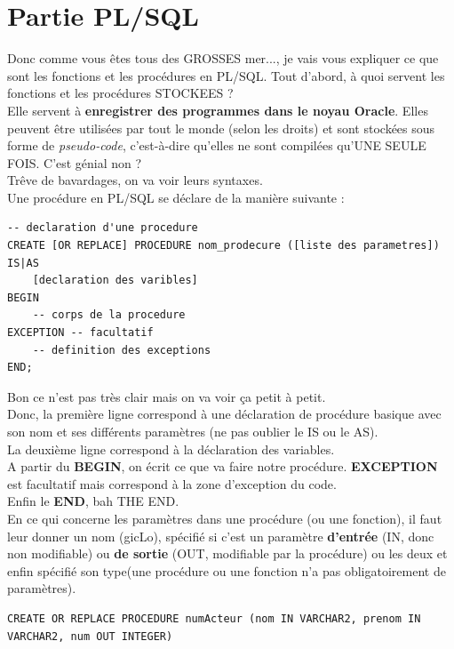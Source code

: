 \documentclass{report}
\begin{document}
\section{Partie PL/SQL}
Donc comme vous êtes tous des GROSSES mer..., je vais vous expliquer ce que sont les fonctions et les procédures en PL/SQL.
Tout d'abord, à quoi servent les fonctions et les procédures STOCKEES ?\\
Elle servent à \textbf{enregistrer des programmes dans le noyau Oracle}. Elles peuvent être utilisées par tout le monde (selon les droits) et sont stockées sous forme de \textit{pseudo-code}, c'est-à-dire qu'elles ne sont compilées qu'UNE SEULE FOIS. C'est génial non ?\\
Trêve de bavardages, on va voir leurs syntaxes.\\
Une procédure en PL/SQL se déclare de la manière suivante :
\begin{lstlisting}[style=MySQLStyle]
-- declaration d'une procedure
CREATE [OR REPLACE] PROCEDURE nom_prodecure ([liste des parametres]) IS|AS
	[declaration des varibles]
BEGIN
	-- corps de la procedure
EXCEPTION -- facultatif
	-- definition des exceptions
END;
\end{lstlisting}

Bon ce n'est pas très clair mais on va voir ça petit à petit.\\
Donc, la première ligne correspond à une déclaration de procédure basique avec son nom et ses différents paramètres (ne pas oublier le IS ou le AS).\\
La deuxième ligne correspond à la déclaration des variables. \\A partir du \textbf{BEGIN}, on écrit ce que va faire notre procédure. \textbf{EXCEPTION} est facultatif mais correspond à la zone d'exception du code. \\Enfin le \textbf{END}, bah THE END.\\
En ce qui concerne les paramètres dans une procédure (ou une fonction), il faut leur donner un nom (gicLo), spécifié si c'est un paramètre \textbf{d'entrée} (IN, donc non modifiable) ou \textbf{de sortie} (OUT, modifiable par la procédure) ou les deux et enfin spécifié son type(une procédure ou une fonction n'a pas obligatoirement de paramètres).\\

\begin{lstlisting}[style=MySQLStyle]
CREATE OR REPLACE PROCEDURE numActeur (nom IN VARCHAR2, prenom IN VARCHAR2, num OUT INTEGER)
\end{lstlisting}
\end{document}
